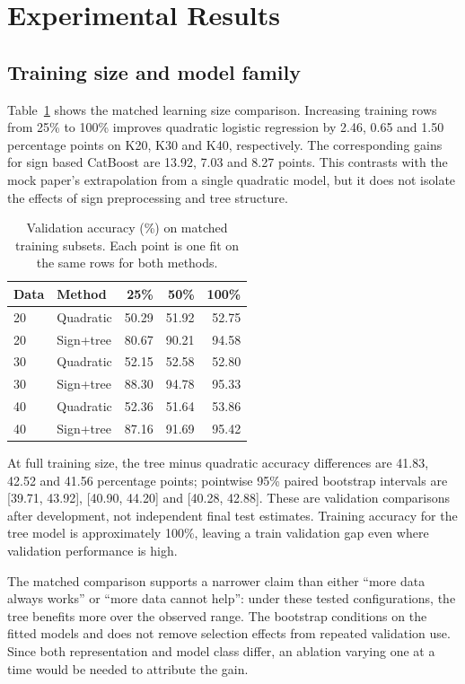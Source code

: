 \documentclass{article}
\begin{document}
\section{Experimental Results}
\subsection{Training size and model family}
Table~\ref{tab:size} shows the matched learning size comparison. Increasing training rows from 25\% to 100\% improves quadratic logistic regression by 2.46, 0.65 and 1.50 percentage points on K20, K30 and K40, respectively. The corresponding gains for sign based CatBoost are 13.92, 7.03 and 8.27 points. This contrasts with the mock paper's extrapolation from a single quadratic model, but it does not isolate the effects of sign preprocessing and tree structure.

\begin{table}[t]
\caption{Validation accuracy (\%) on matched training subsets. Each point is one fit on the same rows for both methods.}
\label{tab:size}
\centering
\begin{tabular}{llrrr}\toprule
Data & Method & 25\% & 50\% & 100\% \\\midrule
20 & Quadratic & 50.29 & 51.92 & 52.75 \\
20 & Sign+tree & 80.67 & 90.21 & 94.58 \\
30 & Quadratic & 52.15 & 52.58 & 52.80 \\
30 & Sign+tree & 88.30 & 94.78 & 95.33 \\
40 & Quadratic & 52.36 & 51.64 & 53.86 \\
40 & Sign+tree & 87.16 & 91.69 & 95.42 \\\bottomrule
\end{tabular}
\end{table}

At full training size, the tree minus quadratic accuracy differences are 41.83, 42.52 and 41.56 percentage points; pointwise 95\% paired bootstrap intervals are [39.71, 43.92], [40.90, 44.20] and [40.28, 42.88]. These are validation comparisons after development, not independent final test estimates. Training accuracy for the tree model is approximately 100\%, leaving a train validation gap even where validation performance is high.

The matched comparison supports a narrower claim than either ``more data always works'' or ``more data cannot help'': under these tested configurations, the tree benefits more over the observed range. The bootstrap conditions on the fitted models and does not remove selection effects from repeated validation use. Since both representation and model class differ, an ablation varying one at a time would be needed to attribute the gain.
\end{document}
